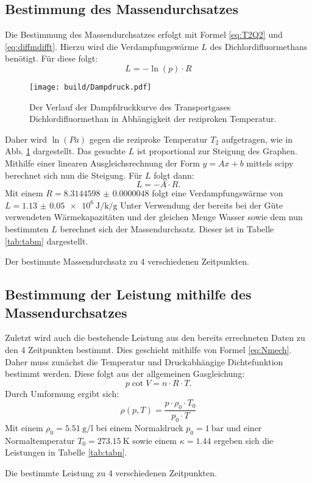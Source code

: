 \subsection{Bestimmung des Massendurchsatzes}
Die Bestimmung des Massendurchsatzes erfolgt mit Formel \ref{eq:T2Q2} und \ref{eq:diffmdifft}.
Hierzu wird die Verdampfungswärme $L$ des Dichlordifluormethans benötigt. Für diese folgt:
\begin{equation}
  L = -\ln(p)\cdot R
\end{equation}
\begin{figure}
 \centering
 \caption{Der Verlauf der Dampfdruckkurve des Transportgases Dichlordifluormethan in Abhängigkeit der reziproken Temperatur.}
 \texttt{[image: build/Dampdruck.pdf]}
 \label{fig:Graph1}
\end{figure}
Daher wird $\ln(Pa)$ gegen die reziproke Temperatur $T_2$ aufgetragen, wie in Abb. \ref{fig:Graph1} dargestellt. Das gesuchte $L$ ist proportional zur Steigung des Graphen.
Mithilfe einer linearen Ausgleichsrechnung der Form $y=Ax+b$ mittels scipy
berechnet sich nun die Steigung. Für $L$ folgt dann:
\begin{equation}
  L = -A\cdot R\text{.}\label{eq:LausA}
\end{equation}
Mit einem $R = \num{8.3144598(48)}$ \cite{R} folgt eine Verdampfungswärme von $L = \SI{1.13(5)e6}{\joule\per\kilo\per\gram}$
Unter Verwendung der bereits bei der Güte verwendeten Wärmekapazitäten und der gleichen
 Menge Wasser sowie dem nun bestimmten $L$ berechnet sich der Massendurchsatz. Dieser ist in Tabelle \ref{tab:tabm} dargestellt.

 \begin{table}
   \centering
   \caption{Der bestimmte Massendurchsatz zu 4 verschiedenen Zeitpunkten.}
   \label{tab:massen}
 \end{table}

\subsection{Bestimmung der Leistung mithilfe des Massendurchsatzes}
Zuletzt wird auch die bestehende Leistung aus den bereits errechneten Daten zu den 4 Zeitpunkten bestimmt.
Dies geschieht mithilfe von Formel \ref{eq:Nmech}. Daher muss zunächst die Temperatur
und Druckabhängige Dichtefunktion bestimmt werden. Diese folgt aus der allgemeinen Gasgleichung:
\begin{equation}
  p\cot V = n\cdot R\cdot T\text{.}
\end{equation}
Durch Umformung ergibt sich:
\begin{equation}
  \rho(p,T) = \frac{p\cdot \rho_0\cdot T_0}{p_0\cdot T}
\end{equation}
Mit einem $\rho_0 = \SI{5.51}{\gram\per\litre}$ \cite{V206} bei einem Normaldruck $p_0 = \SI{1}{\bar}$
und einer Normaltemperatur $T_0 = \SI{273.15}{\kelvin}$ sowie einem $\kappa = 1.44$ \cite{V206} ergeben sich die Leistungen in Tabelle \ref{tab:tabn}.

\begin{table}
  \centering
  \caption{Die bestimmte Leistung zu 4 verschiedenen Zeitpunkten.}
  \label{tab:Leistung}
\end{table}
